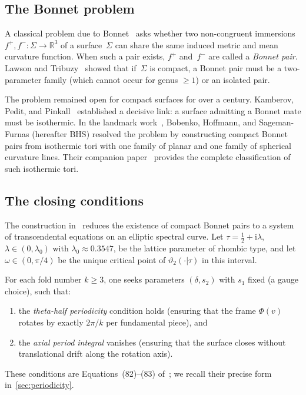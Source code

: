 \documentclass[11pt,a4paper]{article}
\theoremstyle{plain}
\theoremstyle{definition}
\theoremstyle{remark}
\newcommand{\vt}[1]{\vartheta_{#1}}     %
\newcommand{\RR}{\mathbb{R}}
\newcommand{\ii}{\mathrm{i}}
\begin{document}
\subsection{The Bonnet problem}
A classical problem due to Bonnet~\cite{Bon67} asks whether two
non-congruent immersions $f^+, f^- \colon \Sigma \to \RR^3$ of a
surface~$\Sigma$ can share the same induced metric and mean curvature
function.  When such a pair exists, $f^+$ and~$f^-$ are called a
\emph{Bonnet pair}.  Lawson and Tribuzy~\cite{LT81} showed that
if~$\Sigma$ is compact, a Bonnet pair must be a two-parameter family
(which cannot occur for genus $\geq 1$) or an isolated pair.

The problem remained open for compact surfaces for over a century.
Kamberov, Pedit, and Pinkall~\cite{KPP98} established a decisive link:
a surface admitting a Bonnet mate must be isothermic.  In the landmark
work~\cite{BHS25}, Bobenko, Hoffmann, and Sageman-Furnas (hereafter
BHS) resolved the problem by constructing compact Bonnet pairs
from isothermic tori with one family of planar and one family of
spherical curvature lines.  Their companion paper~\cite{BHS-comp}
provides the complete classification of such isothermic tori.

\subsection{The closing conditions}
The construction in~\cite{BHS25} reduces the existence of compact
Bonnet pairs to a system of transcendental equations on an elliptic
spectral curve.  Let $\tau = \tfrac{1}{2} + \ii\lambda$,
$\lambda \in (0,\lambda_0)$ with $\lambda_0 \approx 0.3547$, be the
lattice parameter of rhombic type, and let $\omega \in (0,\pi/4)$ be
the unique critical point of $\vt{2}(\cdot|\tau)$ in this interval.

For each fold number $k \geq 3$, one seeks parameters $(\delta, s_2)$
with $s_1$ fixed (a gauge choice), such that:
\begin{enumerate}[label=(\roman*),nosep]
\item the \emph{theta-half periodicity} condition holds
  (ensuring that the frame $\Phi(v)$ rotates by exactly $2\pi/k$ per
  fundamental piece), and
\item the \emph{axial period integral} vanishes
  (ensuring that the surface closes without translational drift
  along the rotation axis).
\end{enumerate}
These conditions are Equations~(82)--(83) of~\cite{BHS25}; we
recall their precise form in~\cref{sec:periodicity}.
\end{document}
